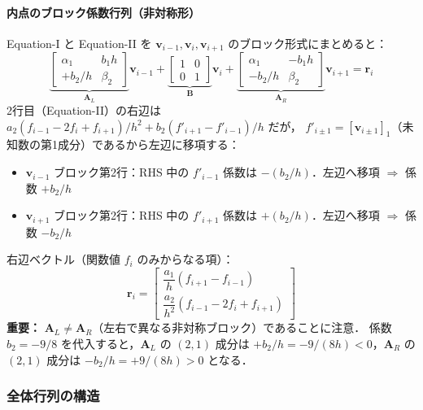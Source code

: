 \paragraph{内点のブロック係数行列（非対称形）}
Equation-I と Equation-II を $\bm{v}_{i-1}, \bm{v}_i, \bm{v}_{i+1}$ のブロック形式にまとめると：
\[
  \underbrace{\begin{bmatrix} \alpha_1 & b_1 h \\ +b_2/h & \beta_2 \end{bmatrix}}_{\mathbf{A}_L}
  \bm{v}_{i-1}
  +
  \underbrace{\begin{bmatrix} 1 & 0 \\ 0 & 1 \end{bmatrix}}_{\mathbf{B}}
  \bm{v}_i
  +
  \underbrace{\begin{bmatrix} \alpha_1 & -b_1 h \\ -b_2/h & \beta_2 \end{bmatrix}}_{\mathbf{A}_R}
  \bm{v}_{i+1}
  = \mathbf{r}_i
\]
2行目（Equation-II）の右辺は
$a_2(f_{i-1}-2f_i+f_{i+1})/h^2 + b_2(f'_{i+1}-f'_{i-1})/h$ だが，
$f'_{i\pm1} = [\bm{v}_{i\pm1}]_1$（未知数の第1成分）であるから左辺に移項する：
\begin{itemize}
  \item $\bm{v}_{i-1}$ ブロック第2行：RHS 中の $f'_{i-1}$ 係数は $-(b_2/h)$．左辺へ移項 $\Rightarrow$ 係数 $+b_2/h$
  \item $\bm{v}_{i+1}$ ブロック第2行：RHS 中の $f'_{i+1}$ 係数は $+(b_2/h)$．左辺へ移項 $\Rightarrow$ 係数 $-b_2/h$
\end{itemize}
右辺ベクトル（関数値 $f_i$ のみからなる項）：
\[
  \mathbf{r}_i =
  \begin{bmatrix}
    \dfrac{a_1}{h}(f_{i+1}-f_{i-1}) \\[8pt]
    \dfrac{a_2}{h^2}(f_{i-1}-2f_i+f_{i+1})
  \end{bmatrix}
\]
\textbf{重要：} $\mathbf{A}_L \neq \mathbf{A}_R$（左右で異なる非対称ブロック）であることに注意．
係数 $b_2 = -9/8$ を代入すると，$\mathbf{A}_L$ の $(2,1)$ 成分は $+b_2/h = -9/(8h) < 0$，$\mathbf{A}_R$ の $(2,1)$ 成分は $-b_2/h = +9/(8h) > 0$ となる．

\subsubsection{全体行列の構造}


